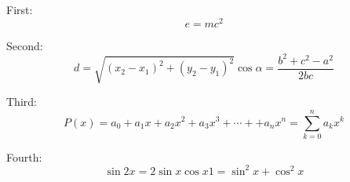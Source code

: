 First:
\[
  e=mc^2
\]

\par Second:
\[
  d = \sqrt{ (x_2 - x_1)^2 + (y_2 - y_1)^2 }
  \cos \alpha = \frac{b^2 + c^2 - a^2}{2bc}
\]

\par Third:
\[
  P(x) = a_0 + a_1 x + a_2 x^2 + a_3 x^3 + \cdots +
  + a_n x^n = \sum_{k=0}^n a_k x^k
\]

\par Fourth:
\[
  \sin 2x = 2 \sin x \cos x
  1 = \sin ^2 x + \cos ^2 x
\]
